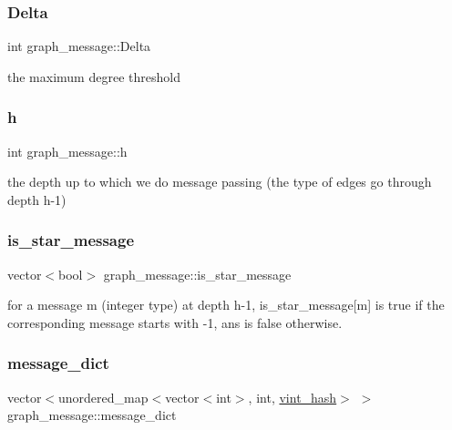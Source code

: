 \subsubsection{\texorpdfstring{Delta}{Delta}}
{\footnotesize\ttfamily int graph\+\_\+message\+::\+Delta\hspace{0.3cm}{\ttfamily [private]}}



the maximum degree threshold 

\mbox{\label{classgraph__message_a934d63ed7275c211e13c6fb68824ed46}} 
\subsubsection{\texorpdfstring{h}{h}}
{\footnotesize\ttfamily int graph\+\_\+message\+::h\hspace{0.3cm}{\ttfamily [private]}}



the depth up to which we do message passing (the type of edges go through depth h-\/1) 

\mbox{\label{classgraph__message_a55ff5531a0043106369e84a7bc45e22d}} 
\subsubsection{\texorpdfstring{is\+\_\+star\+\_\+message}{is\_star\_message}}
{\footnotesize\ttfamily vector$<$bool$>$ graph\+\_\+message\+::is\+\_\+star\+\_\+message}



for a message m (integer type) at depth h-\/1, is\+\_\+star\+\_\+message\mbox{[}m\mbox{]} is true if the corresponding message starts with -\/1, ans is false otherwise. 

\mbox{\label{classgraph__message_ab54d89b122c2b1322da0d5db2043fb84}} 
\subsubsection{\texorpdfstring{message\+\_\+dict}{message\_dict}}
{\footnotesize\ttfamily vector$<$unordered\+\_\+map$<$vector$<$int$>$, int, \hyperlink{structvint__hash}{vint\+\_\+hash}$>$ $>$ graph\+\_\+message\+::message\+\_\+dict}



